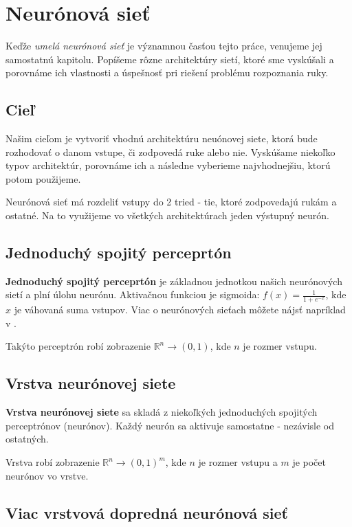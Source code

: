 \chapter{Neurónová sieť}\label{chap:neuralnet}

Keďže \textit{umelá neurónová sieť} je významnou časťou tejto práce, venujeme jej samostatnú kapitolu. Popíšeme rôzne architektúry sietí, ktoré sme vyskúšali a porovnáme ich vlastnosti a úspešnosť pri riešení problému rozpoznania ruky.

\section{Cieľ}

Našim cieľom je vytvoriť vhodnú architektúru neuónovej siete, ktorá bude rozhodovať o danom vstupe, či zodpovedá ruke alebo nie. Vyskúšame niekoľko typov architektúr, porovnáme ich a následne vyberieme najvhodnejšiu, ktorú potom použijeme. 

Neurónová sieť má rozdeliť vstupy do 2 tried - tie, ktoré zodpovedajú rukám a ostatné. Na to využijeme vo všetkých architektúrach jeden výstupný neurón.

\section{Jednoduchý spojitý perceprtón}

\textbf{Jednoduchý spojitý perceprtón} je základnou jednotkou našich neurónových sietí a plní úlohu neurónu. Aktivačnou funkciou je sigmoida: $f(x) = \frac{1}{1+e^{-x}}$, kde $x$ je váhovaná suma vstupov. Viac o neurónových sieťach môžete nájsť napríklad v \cite{haykin1999neural}. 

Takýto perceptrón robí zobrazenie $\mathbb{R}^n\rightarrow (0,1)$, kde $n$ je rozmer vstupu.

\section{Vrstva neurónovej siete}

\textbf{Vrstva neurónovej siete} sa skladá z niekoľkých jednoduchých spojitých perceptrónov (neurónov). Každý neurón sa aktivuje samostatne - nezávisle od ostatných.

Vrstva robí zobrazenie $\mathbb{R}^n\rightarrow (0,1)^m$, kde $n$ je rozmer vstupu a $m$ je počet neurónov vo vrstve.

\section{Viac vrstvová dopredná neurónová sieť}

